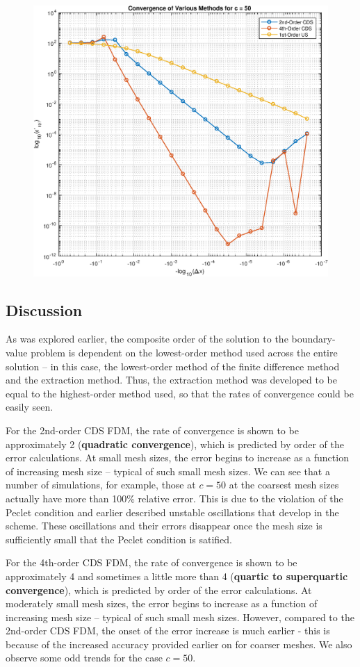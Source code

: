\documentclass[10pt, reqno]{article}		%
\numberwithin{equation}{section}
\begin{document}
\begin{figure}[H]
\begin{center}
		\includegraphics[width=0.46\linewidth]{convergence_c_50}
	\end{center}
\end{figure}

\subsection{Discussion}

As was explored earlier, the composite order of the solution to the boundary-value problem is dependent on the lowest-order method used across the entire solution -- in this case, the lowest-order method of the finite difference method and the extraction method. Thus, the extraction method was developed to be equal to the highest-order method used, so that the rates of convergence could be easily seen.

For the 2nd-order CDS FDM, the rate of convergence is shown to be approximately 2 (\textbf{quadratic convergence}), which is predicted by order of the error calculations. At small mesh sizes, the error begins to increase as a function of increasing mesh size -- typical of such small mesh sizes. We can see that a number of simulations, for example, those at $c=50$ at the coarsest mesh sizes actually have more than 100\% relative error. This is due to the violation of the Peclet condition and earlier described unstable oscillations that develop in the scheme. These oscillations and their errors disappear once the mesh size is sufficiently small that the Peclet condition is satified.

For the 4th-order CDS FDM, the rate of convergence is shown to be approximately 4 and sometimes a little more than 4 (\textbf{quartic to superquartic convergence}), which is predicted by order of the error calculations. At moderately small mesh sizes, the error begins to increase as a function of increasing mesh size -- typical of such small mesh sizes. However, compared to the 2nd-order CDS FDM, the onset of the error increase is much earlier - this is because of the increased accuracy provided earlier on for coarser meshes. We also observe some odd trends for the case $c=50$.
\end{document}
